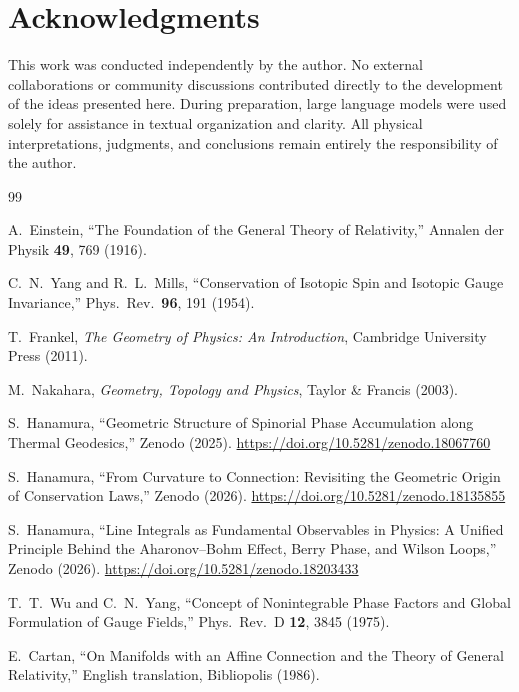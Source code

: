 \documentclass[12pt,letterpaper]{article}
\begin{document}
\section*{Acknowledgments}

This work was conducted independently by the author. No external collaborations or community discussions contributed directly to the development of the ideas presented here. During preparation, large language models were used solely for assistance in textual organization and clarity. All physical interpretations, judgments, and conclusions remain entirely the responsibility of the author.


\begin{thebibliography}{99}

A.~Einstein,
``The Foundation of the General Theory of Relativity,''
Annalen der Physik \textbf{49}, 769 (1916).

C.~N.~Yang and R.~L.~Mills,
``Conservation of Isotopic Spin and Isotopic Gauge Invariance,''
Phys.\ Rev.\ \textbf{96}, 191 (1954).

T.~Frankel,
\textit{The Geometry of Physics: An Introduction},
Cambridge University Press (2011).

M.~Nakahara,
\textit{Geometry, Topology and Physics},
Taylor \& Francis (2003).

S.~Hanamura, ``Geometric Structure of Spinorial Phase Accumulation along Thermal Geodesics,'' Zenodo (2025). \href{https://doi.org/10.5281/zenodo.18067760}{https://doi.org/10.5281/zenodo.18067760}

S.~Hanamura, ``From Curvature to Connection: Revisiting the Geometric Origin of Conservation Laws,'' Zenodo (2026). \href{https://doi.org/10.5281/zenodo.18135855}{https://doi.org/10.5281/zenodo.18135855}

S.~Hanamura, ``Line Integrals as Fundamental Observables in Physics: A Unified Principle Behind the Aharonov--Bohm Effect, Berry Phase, and Wilson Loops,'' Zenodo (2026). \href{https://doi.org/10.5281/zenodo.18203433}{https://doi.org/10.5281/zenodo.18203433}


T.~T.~Wu and C.~N.~Yang,
``Concept of Nonintegrable Phase Factors and Global Formulation of Gauge Fields,''
Phys.\ Rev.\ D \textbf{12}, 3845 (1975).

E.~Cartan,
``On Manifolds with an Affine Connection and the Theory of General Relativity,''
English translation, Bibliopolis (1986).

\end{thebibliography}

\end{document}
